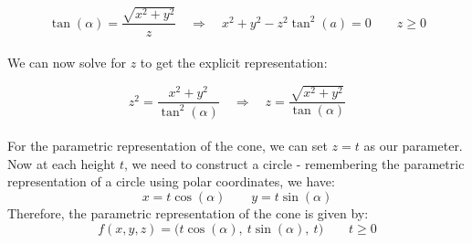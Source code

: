 \documentclass{article}
\begin{document}
    $$\tan(\alpha) = \dfrac{\sqrt{x^2+y^2}}{z}\quad\Rightarrow\quad \boxed{x^2+y^2-z^2\tan^2(a) = 0\qquad z\geq 0}$$\\
    \noindent
    We can now solve for $z$ to get the explicit representation:

    $$z^2 = \dfrac{x^2+y^2}{\tan^2(\alpha)}\quad\Rightarrow\quad\boxed{z = \dfrac{\sqrt{x^2+y^2}}{\tan(\alpha)}}$$\\
    For the parametric representation of the cone, we can set $z=t$ as our parameter. Now at each height $t$, we need to construct a circle - remembering the parametric representation of a circle using polar coordinates, we have:
    $$x = t\cos(\alpha)\qquad y=t\sin(\alpha)$$
    Therefore, the parametric representation of the cone is given by:
    $$\boxed{f(x,y,z) = \big(t\cos(\alpha),\ t\sin(\alpha),\ t\big)\qquad t\geq 0}$$

    \newpage
\end{document}
